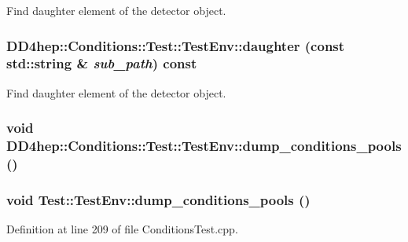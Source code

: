 Find daughter element of the detector object. \hypertarget{struct_d_d4hep_1_1_conditions_1_1_test_1_1_test_env_a5d42d61e9a0f17ff2ef13bf7f617d27e}{
\subsubsection[{daughter}]{ DD4hep::Conditions::Test::TestEnv::daughter (const std::string \& {\em sub\_\-path}) const}}
\label{struct_d_d4hep_1_1_conditions_1_1_test_1_1_test_env_a5d42d61e9a0f17ff2ef13bf7f617d27e}


Find daughter element of the detector object. \hypertarget{struct_d_d4hep_1_1_conditions_1_1_test_1_1_test_env_aa74188c37deebb75495bbdb2964d2228}{
\subsubsection[{dump\_\-conditions\_\-pools}]{\setlength{\rightskip}{0pt plus 5cm}void DD4hep::Conditions::Test::TestEnv::dump\_\-conditions\_\-pools ()}}
\label{struct_d_d4hep_1_1_conditions_1_1_test_1_1_test_env_aa74188c37deebb75495bbdb2964d2228}
\hypertarget{struct_d_d4hep_1_1_conditions_1_1_test_1_1_test_env_a2140fd3bd795ea5f7f3fdcb9d3963d9c}{
\subsubsection[{dump\_\-conditions\_\-pools}]{\setlength{\rightskip}{0pt plus 5cm}void Test::TestEnv::dump\_\-conditions\_\-pools ()}}
\label{struct_d_d4hep_1_1_conditions_1_1_test_1_1_test_env_a2140fd3bd795ea5f7f3fdcb9d3963d9c}


Definition at line 209 of file ConditionsTest.cpp.

